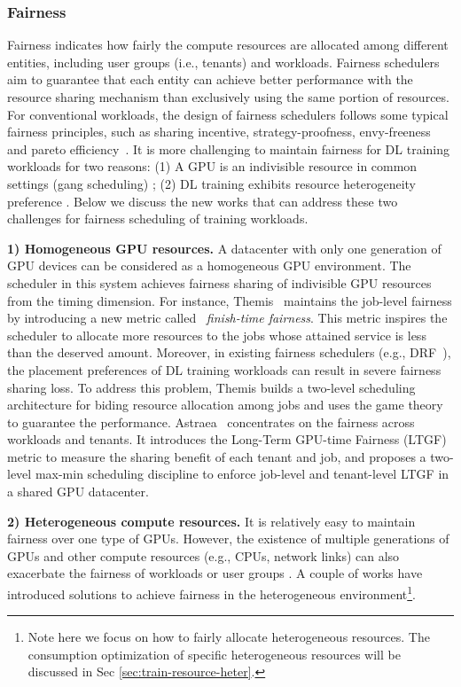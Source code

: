 \subsubsection{Fairness}
Fairness indicates how fairly the compute resources are allocated among different entities, including user groups (i.e., tenants) and workloads. Fairness schedulers aim to guarantee that each entity can achieve better performance with the resource sharing mechanism than exclusively using the same portion of resources. For conventional workloads, the design of fairness schedulers follows some typical fairness principles, such as sharing incentive, strategy-proofness, envy-freeness and pareto efficiency~\cite{DRF}.
It is more challenging to maintain fairness for DL training workloads for two reasons: (1) A GPU is an indivisible resource in common settings (gang scheduling) {\tiny{}}; (2) DL training exhibits resource heterogeneity preference {\tiny{}} {\tiny{}}. Below we discuss the new works that can address these two challenges for fairness scheduling of training workloads.



\textbf{1) Homogeneous GPU resources.} A datacenter with only one generation of GPU devices can be considered as a homogeneous GPU environment. The scheduler in this system achieves fairness sharing of indivisible GPU resources from the timing dimension.
For instance, Themis~\cite{Themis} maintains the job-level fairness by introducing a new metric called ~\emph{finish-time fairness}. This metric inspires the scheduler to allocate more resources to the jobs whose attained service is less than the deserved amount. Moreover, in existing fairness schedulers (e.g., DRF~\cite{DRF}), the placement preferences of DL training workloads can result in severe fairness sharing loss. To address this problem, Themis builds a two-level scheduling architecture for biding resource allocation among jobs and uses the game theory to guarantee the performance.
Astraea~\cite{ASTRAEA} concentrates on the fairness across workloads and tenants.
It introduces the Long-Term GPU-time Fairness (LTGF) metric to measure the sharing benefit of each tenant and job, and proposes a two-level max-min scheduling discipline to enforce job-level and tenant-level LTGF in a shared GPU datacenter.


\textbf{2) Heterogeneous compute resources.} It is relatively easy to maintain fairness over one type of GPUs. However, the existence of multiple generations of GPUs and other compute resources (e.g., CPUs, network links) can also exacerbate the fairness of workloads or user groups {\tiny{}} {\tiny{}}. A couple of works have introduced solutions to achieve fairness in the heterogeneous environment\footnote{Note here we focus on how to fairly allocate heterogeneous resources. The consumption optimization of specific heterogeneous resources will be discussed in Sec \ref{sec:train-resource-heter}.}.

